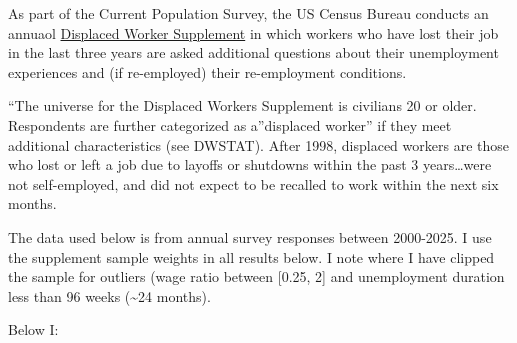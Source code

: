 \documentclass[
]{article}
\begin{document}
As part of the Current Population Survey, the US Census Bureau conducts
an annuaol
\href{https://cps.ipums.org/cps/dw_sample_notes.shtml}{Displaced Worker
Supplement} in which workers who have lost their job in the last three
years are asked additional questions about their unemployment
experiences and (if re-employed) their re-employment conditions.

``The universe for the Displaced Workers Supplement is civilians 20 or
older. Respondents are further categorized as a''displaced worker'' if
they meet additional characteristics (see DWSTAT). After 1998, displaced
workers are those who lost or left a job due to layoffs or shutdowns
within the past 3 years\ldots were not self-employed, and did not expect
to be recalled to work within the next six months.

The data used below is from annual survey responses between 2000-2025. I
use the supplement sample weights in all results below. I note where I
have clipped the sample for outliers (wage ratio between {[}0.25, 2{]}
and unemployment duration less than 96 weeks (\textasciitilde24 months).

Below I:
\end{document}
